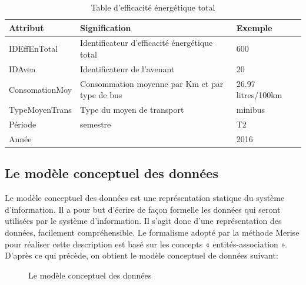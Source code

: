 \documentclass[a4paper]{report}
\begin{document}
\begin{doublespace}
	\begin{table}[H]
		\begin{center}
			\begin{tabularx}{17.5cm}{|p{4cm}|X|p{4cm}|}
				\hline
				\textbf{Attribut} & \textbf{Signification}                        &
				\textbf{Exemple}                                                            \\
				\hline
				IDEffEnTotal      & Identificateur d’efficacité énergétique total &
				600                                                                         \\
				\hline
				IDAven            & Identificateur de l'avenant                   & 20      \\
				\hline
				ConsomationMoy    & Consommation moyenne par Km et par type de bus &
				26.97 litres/100km                                                          \\
				\hline
				TypeMoyenTrans    & Type du moyen de transport                    & minibus \\
				\hline
				Période           & semestre                                      & T2      \\
				\hline
				Année             &                                               & 2016    \\
				\hline
			\end{tabularx}
			\caption{Table d’efficacité énergétique total}
		\end{center}
	\end{table}
	\subsection{Le modèle conceptuel des données}
	Le modèle conceptuel des données est une représentation statique du système d’information.
	Il a pour but d’écrire de façon formelle les données qui seront utilisées par le système d’information.
	Il s’agit donc d’une représentation des données, facilement compréhensible.
	Le formalisme adopté par la méthode Merise pour réaliser cette description est basé sur les concepts « entités-association ».
	D’après ce qui précède, on obtient le modèle conceptuel de données suivant:
	\begin{figure}[H]
		\begin{center}
			\caption{Le modèle conceptuel des données}
		\end{center}
	\end{figure}

\end{doublespace}
\end{document}
